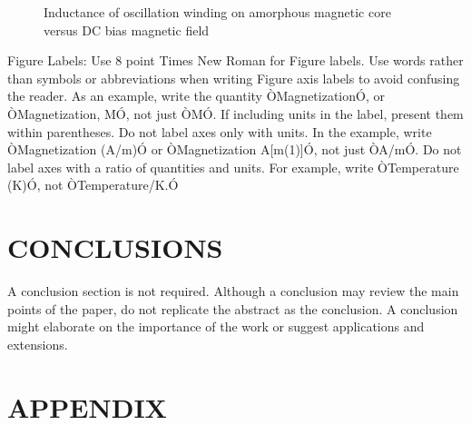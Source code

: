 \documentclass[a4paper, 10pt, conference]{ieeeconf}      %
\begin{document}
	
	\begin{figure}[thpb]
		\centering
		\caption{Inductance of oscillation winding on amorphous
			magnetic core versus DC bias magnetic field}
		\label{figurelabel}
	\end{figure}
	
	
	Figure Labels: Use 8 point Times New Roman for Figure labels. Use words rather than symbols or abbreviations when writing Figure axis labels to avoid confusing the reader. As an example, write the quantity ÒMagnetizationÓ, or ÒMagnetization, MÓ, not just ÒMÓ. If including units in the label, present them within parentheses. Do not label axes only with units. In the example, write ÒMagnetization (A/m)Ó or ÒMagnetization {A[m(1)]}Ó, not just ÒA/mÓ. Do not label axes with a ratio of quantities and units. For example, write ÒTemperature (K)Ó, not ÒTemperature/K.Ó
	
	\section{CONCLUSIONS}
	
	A conclusion section is not required. Although a conclusion may review the main points of the paper, do not replicate the abstract as the conclusion. A conclusion might elaborate on the importance of the work or suggest applications and extensions. 
	
	\addtolength{\textheight}{-12cm}   %
	
	
	
	
	
	
	
	\section*{APPENDIX}
	
\end{document}
